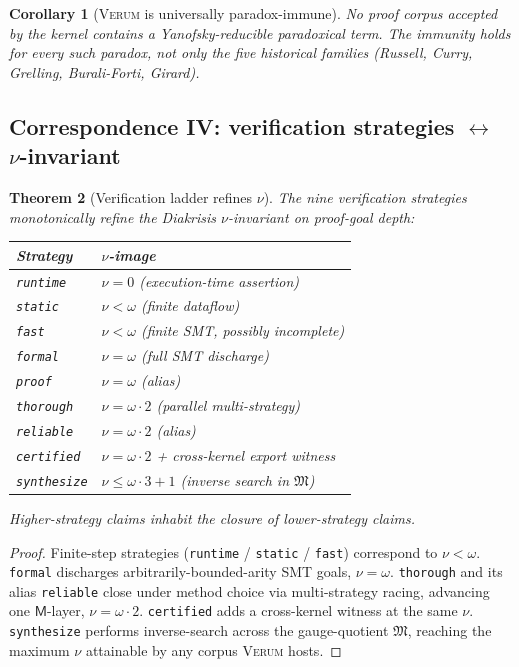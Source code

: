 \documentclass[11pt, a4paper]{article}
\newtheorem{theorem}{Theorem}[section]
\newtheorem{corollary}[theorem]{Corollary}
\theoremstyle{definition}
\theoremstyle{remark}
\newcommand{\fM}{\mathfrak{M}}
\newcommand{\Verum}{\textsc{Verum}}
\begin{document}
\begin{corollary}[\Verum{} is universally paradox-immune]
\label{cor:verum-universal-immunity}
No proof corpus accepted by the kernel contains a Yanofsky-reducible paradoxical term. The immunity holds for every such paradox, not only the five historical families (Russell, Curry, Grelling, Burali-Forti, Girard).
\end{corollary}

\subsection{Correspondence IV: verification strategies $\leftrightarrow$ $\nu$-invariant}
\label{subsec:corr4}

\begin{theorem}[Verification ladder refines $\nu$]
\label{thm:verify-ladder}
The nine verification strategies monotonically refine the Diakrisis $\nu$-invariant on proof-goal depth:
\begin{center}
\begin{tabular}{ll}
\toprule
Strategy & $\nu$-image \\ \midrule
\texttt{runtime} & $\nu = 0$ (execution-time assertion) \\
\texttt{static}  & $\nu < \omega$ (finite dataflow) \\
\texttt{fast}    & $\nu < \omega$ (finite SMT, possibly incomplete) \\
\texttt{formal}  & $\nu = \omega$ (full SMT discharge) \\
\texttt{proof}   & $\nu = \omega$ (alias) \\
\texttt{thorough}  & $\nu = \omega \cdot 2$ (parallel multi-strategy) \\
\texttt{reliable}  & $\nu = \omega \cdot 2$ (alias) \\
\texttt{certified} & $\nu = \omega \cdot 2$ + cross-kernel export witness \\
\texttt{synthesize} & $\nu \leq \omega \cdot 3 + 1$ (inverse search in $\fM$) \\
\bottomrule
\end{tabular}
\end{center}
Higher-strategy claims inhabit the closure of lower-strategy claims.
\end{theorem}

\begin{proof}
Finite-step strategies (\texttt{runtime} / \texttt{static} / \texttt{fast}) correspond to $\nu < \omega$. \texttt{formal} discharges arbitrarily-bounded-arity SMT goals, $\nu = \omega$. \texttt{thorough} and its alias \texttt{reliable} close under method choice via multi-strategy racing, advancing one $\mathsf{M}$-layer, $\nu = \omega \cdot 2$. \texttt{certified} adds a cross-kernel witness at the same $\nu$. \texttt{synthesize} performs inverse-search across the gauge-quotient $\fM$, reaching the maximum $\nu$ attainable by any corpus \Verum{} hosts.
\end{proof}
\end{document}
